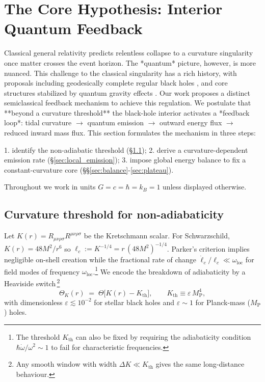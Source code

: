 
\section{The Core Hypothesis: Interior Quantum Feedback}
\label{sec:core_hypothesis}

Classical general relativity predicts relentless collapse to a curvature singularity once matter crosses the event horizon. The *quantum* picture, however, is more nuanced. This challenge to the classical singularity has a rich history, with proposals including geodesically complete regular black holes \cite{bardeen1968non, hayward2006formation, Bonanno2023RegularBH}, and core structures stabilized by quantum gravity effects \cite{bojowald2005nonsingular, rovelli1996black}. Our work proposes a distinct semiclassical feedback mechanism to achieve this regulation. We postulate that **beyond a curvature threshold** the black-hole interior activates a *feedback loop*: tidal curvature $\longrightarrow$ quantum emission $\longrightarrow$ outward energy flux $\longrightarrow$ reduced inward mass flux. This section formulates the mechanism in three steps:

1. identify the non-adiabatic threshold (§\ref{sec:curv_threshold});
2. derive a curvature-dependent emission rate (§\ref{sec:local_emission});
3. impose global energy balance to fix a constant-curvature core
(§§\ref{sec:balance}-\ref{sec:plateau}).\smallskip

Throughout we work in units $G=c=\hbar=k_B=1$ unless displayed otherwise.

\subsection{Curvature threshold for non-adiabaticity}
\label{sec:curv_threshold}

Let $K(r)=R_{\mu\nu\rho\sigma}R^{\mu\nu\rho\sigma}$ be the Kretschmann scalar. For Schwarzschild, $K(r)=48M^{2}/r^{6}$ so $\ell_c\!:=\!K^{-1/4}=r\,(48M^{2})^{-1/4}$. Parker's criterion \cite{parker1968} implies negligible on-shell creation while the fractional rate of change $\dot{\ell}_c/\ell_c \ll \omega_{\mathrm{loc}}$ for field modes of frequency $\omega_{\mathrm{loc}}$.\footnote{The threshold $K_{\mathrm{th}}$ can also be fixed by requiring the adiabaticity condition $\hbar \dot{\omega}/\omega^2 \sim 1$ to fail for characteristic frequencies.} We encode the breakdown of adiabaticity by a Heaviside switch\,\footnote{Any smooth window with width $\Delta K\ll K_{\mathrm{th}}$ gives the same long-distance behaviour.}  
\begin{equation}
  \Theta_K(r)\;=\;\Theta\!\bigl[K(r)-K_{\mathrm{th}}\bigr],
  \qquad K_{\mathrm{th}}\equiv\varepsilon\,M_\mathrm{P}^{4},
  \label{eq:ThetaSwitch}
\end{equation}
with dimensionless $\varepsilon\!\lesssim\!10^{-2}$ for stellar black holes and $\varepsilon\!\sim\!1$ for Planck-mass ($M_\mathrm{P}$) holes.

